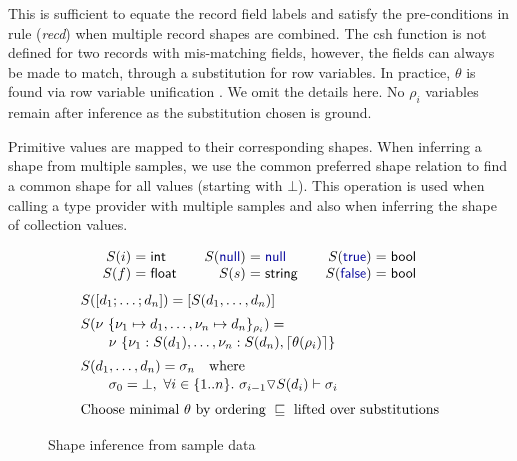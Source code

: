 \documentclass[10pt,nocopyrightspace]{sigplanconf}
\newcommand{\kvd}[1]{\textnormal{\textcolor{kvdclr}{\sffamily #1}}}
\newcommand{\ident}[1]{\textnormal{\sffamily #1}}
\newcommand{\narrow}[1]{\hspace{-0.7em} #1 \hspace{-0.7em}}
\newcommand{\addopt}[1]{\lceil#1\rceil}
\newcommand{\semalt}[1]{S(#1)}
\begin{document}
This is sufficient to equate the record field labels and satisfy the pre-conditions in rule
(\emph{recd}) when multiple record shapes are combined. The \ident{csh} function is not defined for
two records with mis-matching fields, however, the fields can always be made to match, through
a substitution for row variables. In practice, $\theta$ is found via row
variable unification \cite{rows-remy}. We omit the details here. No $\rho_i$ variables remain after
inference as the substitution chosen is ground.

Primitive  values are mapped to their corresponding shapes.
When inferring a shape from multiple samples, we use the common preferred shape relation to find a
common shape for all values (starting with $\bot$). This operation is used
when calling a type provider with multiple samples and also when inferring the shape of collection
values.



\begin{figure}[!h]
\begin{equation*}
\begin{array}{rclcrclcrcl}
 \semalt{i} &\narrow{=}& \ident{int} && \semalt{\kvd{null}}  &\narrow{=}& \kvd{null} && \semalt{\kvd{true}} &\narrow{=}& \ident{bool}\\
 \semalt{f} &\narrow{=}& \ident{float} && \semalt{s} &\narrow{=}& \ident{string} && \semalt{\kvd{false}}  &\narrow{=}& \ident{bool}\\
\end{array}
\end{equation*}
\noindent
\vspace{-0.5em}
\begin{equation*}
\begin{array}{l}
 \semalt{[d_1; \ldots; d_n]} = [\semalt{d_1, \ldots, d_n}]
 \\[0.5em]
 \semalt{\nu~\{ \nu_1 \mapsto d_1, \ldots, \nu_n \mapsto d_n \}_{\rho_i}} =\\[0.1em]
 \qquad\nu~\{ \nu_1:\semalt{d_1}, \ldots, \nu_n :\semalt{d_n}, \addopt{\theta(\rho_i)} \}
 \\[0.5em]
 \semalt{d_1, \ldots, d_n} = \sigma_n \quad\textnormal{where}\\[0.1em]
 \qquad\sigma_0 = \bot,~ \forall i\in \{ 1.. n \}.~ \sigma_{i-1} \triangledown \semalt{d_i} \vdash \sigma_i \\[0.6em]
 \textnormal{Choose minimal}\ \theta\ \textnormal{by ordering}\ \sqsubseteq\ \textnormal{lifted over substitutions} \\[0.1em]
\end{array}
\end{equation*}
\caption{Shape inference from sample data}
\label{fig:shape-inference}
\vspace{-1em}
\end{figure}
\end{document}
